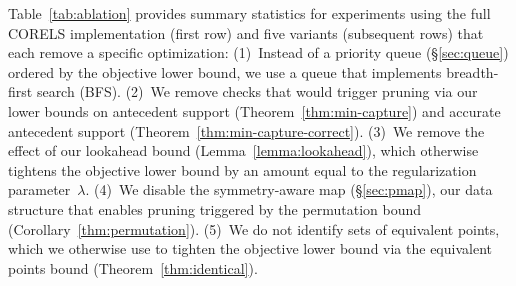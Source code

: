 \documentclass[twoside,11pt]{article}
\def\Reg{{\lambda}}
\begin{document}
Table~\ref{tab:ablation} provides summary statistics for experiments using the full
CORELS implementation (first row) and five variants (subsequent rows) that each remove a specific optimization:
%
(1)~Instead of a priority queue (\S\ref{sec:queue}) ordered by the objective lower bound,
we use a queue that implements breadth-first search (BFS).
%
(2)~We remove checks that would trigger pruning via
our lower bounds on antecedent support (Theorem~\ref{thm:min-capture})
and accurate antecedent support (Theorem~\ref{thm:min-capture-correct}).
%
(3)~We remove the effect of our lookahead bound (Lemma~\ref{lemma:lookahead}),
which otherwise tightens the objective lower bound by an amount equal to the regularization parameter~$\Reg$.
%
(4)~We disable the symmetry-aware map (\S\ref{sec:pmap}), our data structure
that enables pruning triggered by the permutation bound (Corollary~\ref{thm:permutation}).
%
(5)~We do not identify sets of equivalent points, which we otherwise use to tighten the
objective lower bound via the equivalent points bound (Theorem~\ref{thm:identical}).
\end{document}

